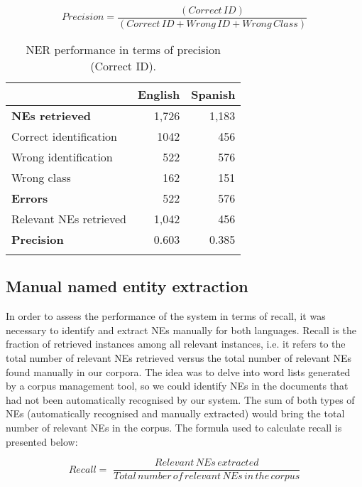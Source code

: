 \documentclass[output=paper]{langscibook}
\begin{document}
\begin{equation*}
    Precision = \frac{(Correct\,ID)}{(Correct\,ID + Wrong\,ID + Wrong\,Class)}
\end{equation*}

\begin{table}
\begin{tabularx}{\textwidth}{Qrr} 
\lsptoprule
& {\bfseries English} & {\bfseries Spanish}\\
\midrule
{\bfseries NEs retrieved} & 1,726 & 1,183\\
Correct identification & 1042 & 456\\
Wrong identification & 522 & 576\\
Wrong class & 162 & 151\\
{\bfseries Errors} & 522 & 576\\
Relevant NEs retrieved & 1,042 & 456\\
{\bfseries Precision} & 0.603 & 0.385\\
\lspbottomrule
\end{tabularx}
\caption{
NER performance in terms of precision (Correct ID).
}
\label{tab:corpas:5}
\end{table}


\subsection{Manual named entity extraction}\label{sec:corpas:4.2}

In order to assess the performance of the system in terms of recall, it was necessary to identify and extract NEs manually for both languages. Recall is the fraction of retrieved instances among all relevant instances, i.e. it refers to the total number of relevant NEs retrieved versus the total number of relevant NEs found manually in our corpora. The idea was to delve into word lists generated by a corpus management tool, so we could identify NEs in the documents that had not been automatically recognised by our system. The sum of both types of NEs (automatically recognised and manually extracted) would bring the total number of relevant NEs in the corpus. The formula used to calculate recall is presented below:

\begin{equation*}
\mathit{Recall}=\text{~}\frac{\mathit{Relevant}\,\mathit{NEs}\,\mathit{extracted}}{\mathit{Total}\,\mathit{number}\,\mathit{of}\,\mathit{relevant}\,\mathit{NEs}\,in\,\mathit{the}\,\mathit{corpus}}
\end{equation*}
\end{document}
